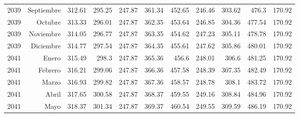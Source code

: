 \documentclass{article}%
\begin{document}
\begin{longtable}{|l r|r|r|r|r|r|r|r|r|r|}
2039&Septiembre&312.61&295.25&247.87&361.34&452.65&246.46&303.62&476.3&170.92\\%
2039&Octubre&313.33&296.01&247.87&362.35&453.64&246.85&304.36&477.54&170.92\\%
2039&Noviembre&314.05&296.77&247.87&363.35&454.62&247.23&305.11&478.78&170.92\\%
2039&Diciembre&314.77&297.54&247.87&364.35&455.61&247.62&305.86&480.01&170.92\\%
2041&Enero&315.49&298.3&247.87&365.36&456.6&248.01&306.6&481.25&170.92\\%
2041&Febrero&316.21&299.06&247.87&366.36&457.58&248.39&307.35&482.49&170.92\\%
2041&Marzo&316.93&299.82&247.87&367.36&458.57&248.78&308.1&483.72&170.92\\%
2041&Abril&317.65&300.58&247.87&368.37&459.55&249.16&308.84&484.96&170.92\\%
2041&Mayo&318.37&301.34&247.87&369.37&460.54&249.55&309.59&486.19&170.92\\%
\hline%
\end{longtable}

%
\end{document}
